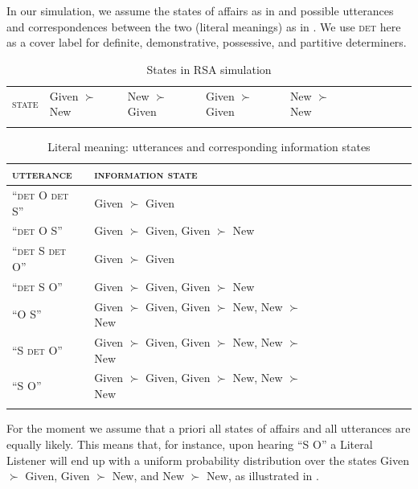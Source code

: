 \documentclass[output=paper,modfonts,nonflat]{langsci/langscibook}
\begin{document}
In our simulation, we assume the states of affairs as in  and possible utterances and correspondences between the two (literal meanings) as in . We use {\scshape det} here as a cover label for definite, demonstrative, possessive, and partitive determiners.

\begin{table}
\begin{tabular}{llllllllll}
\lsptoprule
{\scshape state} & Given $\succ$ New & New $\succ$ Given & Given $\succ$ Given & New $\succ$ New \\
\lspbottomrule
\end{tabular}
\caption{States in RSA simulation}\label{states}
\end{table}

\begin{table}
\begin{tabular}{llllllllll}
\lsptoprule
{\scshape utterance} & {\scshape information state} \\\midrule
 ``{\scshape det} O {\scshape det} S'' & Given $\succ$ Given\\
 ``{\scshape det} O S'' & Given $\succ$ Given, Given $\succ$ New\\
 ``{\scshape det} S {\scshape det} O'' & Given $\succ$ Given\\
 ``{\scshape det} S O'' & Given $\succ$ Given, Given $\succ$ New\\
 ``O S'' & Given $\succ$ Given, Given $\succ$ New, New $\succ$ New\\
 ``S {\scshape det} O'' & Given $\succ$ Given, Given $\succ$ New, New $\succ$ New\\
 ``S O'' & Given $\succ$ Given, Given $\succ$ New, New $\succ$ New\\
\lspbottomrule
\end{tabular}
\caption{Literal meaning: utterances and corresponding information states}\label{table:meanings}
\end{table}

For the moment we assume that a priori all states of affairs and all utterances are equally likely. This means that, for instance, upon hearing  ``S O'' a Literal Listener will end up with a uniform probability distribution over the states Given $\succ$ Given, Given $\succ$ New, and New $\succ$ New, as illustrated in .
\end{document}
